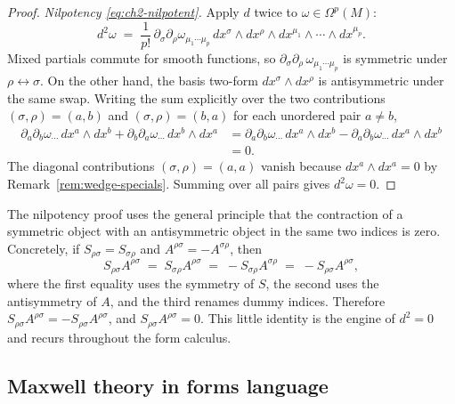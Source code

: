 \begin{proof}
\medskip

\noindent \emph{Nilpotency \eqref{eq:ch2-nilpotent}.} Apply $d$ twice to $\omega \in \Omega^p(M)$:
\begin{equation*}
d^2\omega \;=\; \frac{1}{p!}\,\partial_\sigma\partial_\rho \omega_{\mu_1\cdots\mu_p}\,dx^\sigma \wedge dx^\rho \wedge dx^{\mu_1}\wedge\cdots\wedge dx^{\mu_p}.
\end{equation*}
Mixed partials commute for smooth functions, so $\partial_\sigma\partial_\rho\,\omega_{\mu_1\cdots\mu_p}$ is symmetric under $\rho\leftrightarrow\sigma$. On the other hand, the basis two-form $dx^\sigma\wedge dx^\rho$ is antisymmetric under the same swap. Writing the sum explicitly over the two contributions $(\sigma,\rho) = (a,b)$ and $(\sigma,\rho) = (b,a)$ for each unordered pair $a \ne b$,
\begin{align*}
\partial_a\partial_b\omega_{\cdots}\,dx^a\wedge dx^b + \partial_b\partial_a\omega_{\cdots}\,dx^b\wedge dx^a
&= \partial_a\partial_b\omega_{\cdots}\,dx^a\wedge dx^b - \partial_a\partial_b\omega_{\cdots}\,dx^a\wedge dx^b \\
&= 0.
\end{align*}
The diagonal contributions $(\sigma,\rho) = (a,a)$ vanish because $dx^a \wedge dx^a = 0$ by Remark~\ref{rem:wedge-specials}. Summing over all pairs gives $d^2\omega = 0$.
\end{proof}

\begin{remark}\label{rem:sym-anti}
The nilpotency proof uses the general principle that the contraction of a symmetric object with an antisymmetric object in the same two indices is zero. Concretely, if $S_{\rho\sigma} = S_{\sigma\rho}$ and $A^{\rho\sigma} = -A^{\sigma\rho}$, then
\begin{equation*}
S_{\rho\sigma}A^{\rho\sigma} \;=\; S_{\sigma\rho}A^{\rho\sigma} \;=\; -S_{\sigma\rho}A^{\sigma\rho} \;=\; -S_{\rho\sigma}A^{\rho\sigma},
\end{equation*}
where the first equality uses the symmetry of $S$, the second uses the antisymmetry of $A$, and the third renames dummy indices. Therefore $S_{\rho\sigma}A^{\rho\sigma} = -S_{\rho\sigma}A^{\rho\sigma}$, and $S_{\rho\sigma}A^{\rho\sigma} = 0$. This little identity is the engine of $d^2 = 0$ and recurs throughout the form calculus.
\end{remark}

\subsection{Maxwell theory in forms language}\label{sec:forms-maxwell}

